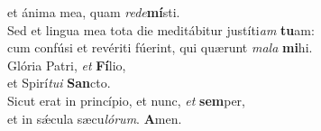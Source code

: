 \evenverse et ánima mea, quam \textit{re}\textit{de}\textbf{mí}sti.\\
\oddverse Sed et lingua mea tota die meditábitur justíti\textit{am} \textbf{tu}am:~\*\\
\oddverse cum confúsi et revériti fúerint, qui quærunt \textit{ma}\textit{la} \textbf{mi}hi.\\
\evenverse Glória Patri, \textit{et} \textbf{Fí}lio,~\*\\
\evenverse et Spirí\textit{tu}\textit{i} \textbf{San}cto.\\
\oddverse Sicut erat in princípio, et nunc, \textit{et} \textbf{sem}per,~\*\\
\oddverse et in sǽcula sæcu\textit{ló}\textit{rum}. \textbf{A}men.\\
